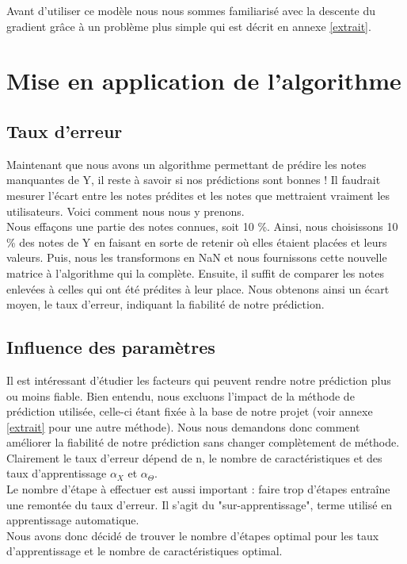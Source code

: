 \documentclass[a4paper,10pt]{article}
\begin{document}
Avant d’utiliser ce modèle nous nous sommes familiarisé avec la descente du gradient grâce à un problème plus simple qui est décrit en annexe \ref{extrait}.

\section{Mise en application de l'algorithme}

\subsection{Taux d'erreur}

Maintenant que nous avons un algorithme permettant de prédire les notes manquantes de Y, il reste à savoir si nos prédictions sont bonnes ! Il faudrait mesurer l'écart entre les notes prédites et les notes que mettraient vraiment les utilisateurs. Voici comment nous nous y prenons.\\

Nous effaçons une partie des notes connues, soit 10 \%. 
Ainsi, nous choisissons 10 \% des notes de Y en faisant en sorte de retenir où elles étaient placées et leurs valeurs. 
Puis, nous les transformons en NaN et nous fournissons cette nouvelle matrice à l'algorithme qui la complète.
Ensuite, il suffit de comparer les notes enlevées à celles qui ont été prédites à leur place. 
Nous obtenons ainsi un écart moyen, le taux d'erreur, indiquant la fiabilité de notre prédiction.

\subsection{Influence des paramètres}

Il est intéressant d'étudier les facteurs qui peuvent rendre notre prédiction plus ou moins fiable. Bien entendu, nous excluons l'impact de la méthode de prédiction utilisée, celle-ci étant fixée à la base de notre projet (voir annexe \ref{extrait} pour une autre méthode). Nous nous demandons donc comment améliorer la fiabilité de notre prédiction sans changer complètement de méthode.\\

Clairement le taux d'erreur dépend de n, le nombre de caractéristiques et des taux d'apprentissage $\alpha_X$ et $\alpha_\Theta$.\\
Le nombre d'étape à effectuer est aussi important : faire trop d'étapes entraîne une remontée du taux d'erreur. Il s'agit du "sur-apprentissage", terme utilisé en apprentissage automatique.\\
Nous avons donc décidé de trouver le nombre d'étapes optimal pour les taux d'apprentissage et le nombre de caractéristiques optimal.\\
\end{document}
